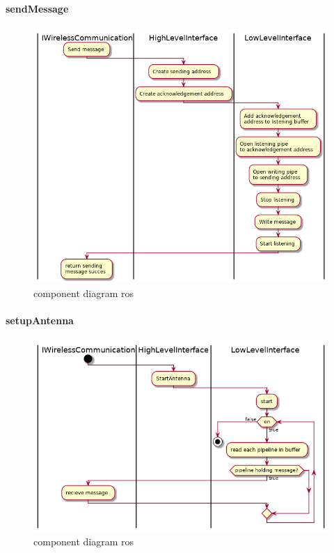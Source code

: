 \documentclass[a4paper, 11pt, oneside]{report}
\begin{document}
\paragraph{sendMessage}
\label{DetailedDesign:NRF24:activity:recieveMessage}

\begin{figure}[H]
	\begin{center}\includegraphics[width=1\linewidth]{UML/out/NRF24/activity/sendMessage/sendMessage.png}\end{center}
	\caption{component diagram ros}
	\label{fig:NRF24:activity:sendMessage}
\end{figure}

\paragraph{setupAntenna}
\label{DetailedDesign:NRF24:activity:setupAntenna}

\begin{figure}[H]
	\begin{center}\includegraphics[width=1\linewidth]{UML/out/NRF24/activity/setupAntenna/setupAntenna.png}\end{center}
	\caption{component diagram ros}
	\label{fig:NRF24:activity:setupAntenna}
\end{figure}
\end{document}
